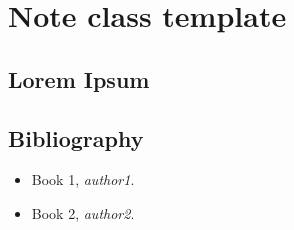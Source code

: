\documentclass[9pt, a4paper]{../myTemplates/notesR3NT0N}
\begin{document}
\sloppy     %




%
%
\chapter{Note class template}
\section{Lorem Ipsum}
\lipsum[0-8]

\section{Bibliography}
\begin{itemize}
   \item Book 1, \textit{author1}.
   \item Book 2, \textit{author2}.
\end{itemize}

\end{document}
